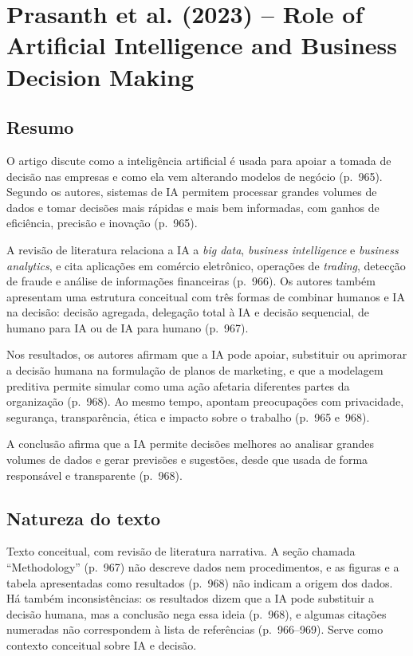 \section{Prasanth et al. (2023) -- Role of Artificial Intelligence and Business Decision Making}

\subsection*{Resumo}

O artigo discute como a inteligência artificial é usada para apoiar a tomada de decisão nas empresas e como ela vem alterando modelos de negócio (p.~965). Segundo os autores, sistemas de IA permitem processar grandes volumes de dados e tomar decisões mais rápidas e mais bem informadas, com ganhos de eficiência, precisão e inovação (p.~965).

A revisão de literatura relaciona a IA a \emph{big data}, \emph{business intelligence} e \emph{business analytics}, e cita aplicações em comércio eletrônico, operações de \emph{trading}, detecção de fraude e análise de informações financeiras (p.~966). Os autores também apresentam uma estrutura conceitual com três formas de combinar humanos e IA na decisão: decisão agregada, delegação total à IA e decisão sequencial, de humano para IA ou de IA para humano (p.~967).

Nos resultados, os autores afirmam que a IA pode apoiar, substituir ou aprimorar a decisão humana na formulação de planos de marketing, e que a modelagem preditiva permite simular como uma ação afetaria diferentes partes da organização (p.~968). Ao mesmo tempo, apontam preocupações com privacidade, segurança, transparência, ética e impacto sobre o trabalho (p.~965 e~968).

A conclusão afirma que a IA permite decisões melhores ao analisar grandes volumes de dados e gerar previsões e sugestões, desde que usada de forma responsável e transparente  (p.~968).

\subsection*{Natureza do texto}

Texto conceitual, com revisão de literatura narrativa. A seção chamada ``Methodology'' (p.~967) não descreve dados nem procedimentos, e as figuras e a tabela apresentadas como resultados (p.~968) não indicam a origem dos dados. Há também inconsistências: os resultados dizem que a IA pode substituir a decisão humana, mas a conclusão nega essa ideia (p.~968), e algumas citações numeradas não correspondem à lista de referências (p.~966--969). Serve como contexto conceitual sobre IA e decisão.

